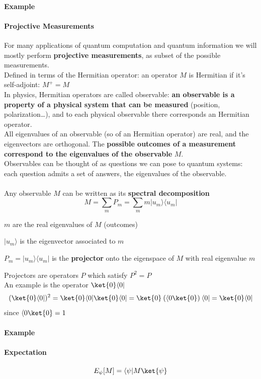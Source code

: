 \documentclass[10pt]{report}
\begin{document}
\paragraph{Example} %
\paragraph{Projective Measurements} For many applications of quantum computation and quantum information we will mostly perform \textbf{projective measurements}, as subset of the possible measurements.\\
Defined in terms of the Hermitian operator: an operator $M$ is Hermitian if it's self-adjoint: $M^+ = M$\\
In physics, Hermitian operators are called observable: \textbf{an observable is a property of a physical system that can be measured} (position, polarization\ldots), and to each physical observable there corresponds an Hermitian operator.\\
All eigenvalues of an observable (so of an Hermitian operator) are real, and the eigenvectors are orthogonal. The \textbf{possible outcomes of a measurement correspond to the eigenvalues of the observable} $M$.\\
Observables can be thought of as questions we can pose to quantum systems: each question admits a set of answers, the eigenvalues of the observable.\\\\Any observable $M$ can be written as its \textbf{spectral decomposition} $$M = \sum_m P_m = \sum_m m|u_m\rangle\langle u_m|$$
\begin{list}{}{}
	\item $m$ are the real eigenvalues of $M$ (outcomes)
	\item $|u_m\rangle$ is the eigenvector associated to $m$
	\item $P_m = |u_m\rangle\langle u_m|$ is the \textbf{projector} onto the eigenspace of $M$ with real eigenvalue $m$
\end{list}
Projectors are operators $P$ which satisfy $P^2 = P$\\
An example is the operator $\ket{0}\langle0|$ $$(\ket{0}\langle0|)^2 = \ket{0}\langle0|\ket{0}\langle0| = \ket{0}\:(\langle0\ket{0})\:\langle0| = \ket{0}\langle0|$$ since $\langle0\ket{0} = 1$
\paragraph{Example} %
\paragraph{Expectation}
$$E_\psi[M] = \langle\psi|M\ket{\psi}$$
\end{document}
